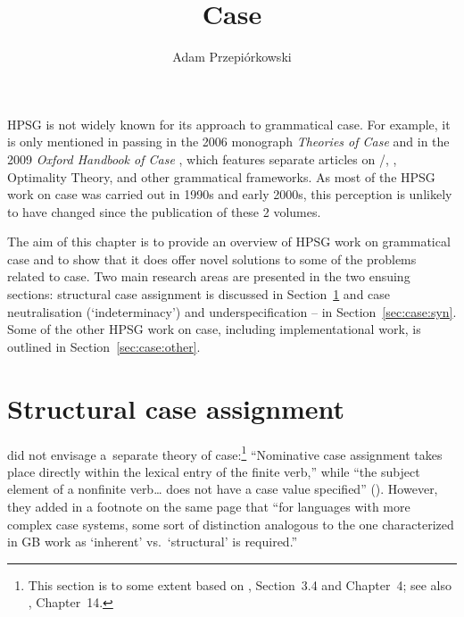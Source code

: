 \documentclass[output=paper]{langsci/langscibook}
\author{%
	Adam Przepiórkows­ki\affiliation{Polish Academy of Sciences}%
}
\title{Case}
\begin{document}
\label{chap-case}


HPSG is not widely known for its approach to grammatical case.  For example, it is only mentioned in passing in the 2006 monograph \emph{Theories of Case} \citep[225]{butt:06} and in the 2009 \emph{Oxford Handbook of Case} \citep[43]{mal:spe:09}, which features separate articles on \gb/\minimalism, \lfg, Optimality Theory, and other grammatical frameworks.  As most of the HPSG work on case was carried out in 1990s and early 2000s, this perception is unlikely to have changed since the publication of these 2 volumes.

The aim of this chapter is to provide an overview of HPSG work on grammatical case and to show that it does offer novel solutions to some of the problems related to case.  Two main research areas are presented in the two ensuing sections: structural case assignment is discussed in Section~\ref{sec:case:str} and case neutralisation (`indeterminacy’) and underspecification – in Section~\ref{sec:case:syn}.  Some of the other HPSG work on case, including implementational work, is outlined in Section~\ref{sec:case:other}.  %


\section{Structural case assignment}
\label{sec:case:str}

\citet{ps2} did not envisage a~separate theory of case:\footnote{This section is to some extent based on \citealt{Prze99b}, Section~3.4 and Chapter~4; see also \citealt{MuellerLehrbuch3}, Chapter~14.} “Nominative case assignment takes place directly within the lexical entry of the finite verb,” while “the subject  element of a nonfinite verb… does not have a case value specified” ().  However, they added in a footnote on the same page that “for languages with more complex case systems, some sort of distinction analogous to the one characterized in GB work as `inherent’ vs.~`structural’ is required.”  
\end{document}
